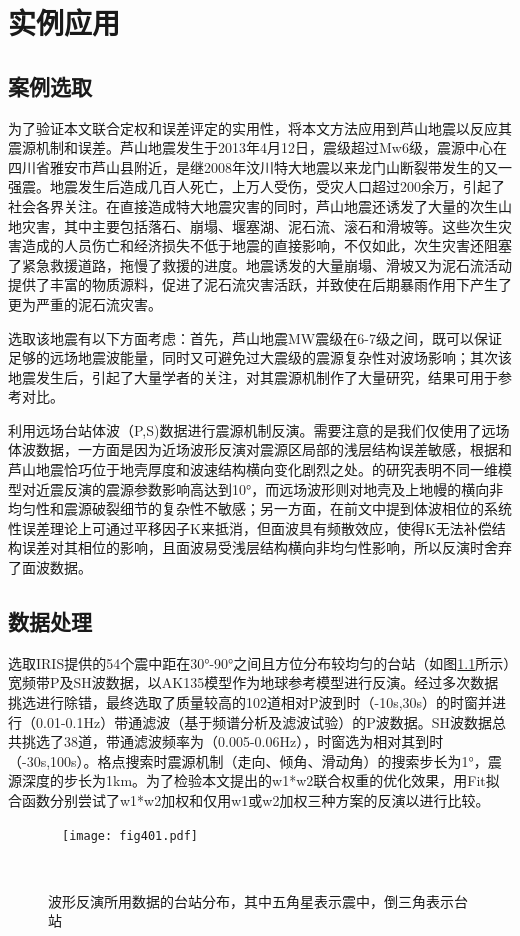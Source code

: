 

\chapter{实例应用}

\section{案例选取}

为了验证本文联合定权和误差评定的实用性，将本文方法应用到芦山地震以反应其震源机制和误差。芦山地震发生于2013年4月12日，震级超过Mw6级，震源中心在四川省雅安市芦山县附近，是继2008年汶川特大地震以来龙门山断裂带发生的又一强震。地震发生后造成几百人死亡，上万人受伤，受灾人口超过200余万，引起了社会各界关注。在直接造成特大地震灾害的同时，芦山地震还诱发了大量的次生山地灾害，其中主要包括落石、崩塌、堰塞湖、泥石流、滚石和滑坡等。这些次生灾害造成的人员伤亡和经济损失不低于地震的直接影响，不仅如此，次生灾害还阻塞了紧急救援道路，拖慢了救援的进度。地震诱发的大量崩塌、滑坡又为泥石流活动提供了丰富的物质源料，促进了泥石流灾害活跃，并致使在后期暴雨作用下产生了更为严重的泥石流灾害。

选取该地震有以下方面考虑：首先，芦山地震MW震级在6-7级之间，既可以保证足够的远场地震波能量，同时又可避免过大震级的震源复杂性对波场影响；其次该地震发生后，引起了大量学者的关注，对其震源机制作了大量研究，结果可用于参考对比。

利用远场台站体波（P,S)数据进行震源机制反演。需要注意的是我们仅使用了远场体波数据，一方面是因为近场波形反演对震源区局部的浅层结构误差敏感，根据和 芦山地震恰巧位于地壳厚度和波速结构横向变化剧烈之处。的研究表明不同一维模型对近震反演的震源参数影响高达到10°，而远场波形则对地壳及上地幔的横向非均匀性和震源破裂细节的复杂性不敏感；另一方面，在前文中提到体波相位的系统性误差理论上可通过平移因子K来抵消，但面波具有频散效应，使得K无法补偿结构误差对其相位的影响，且面波易受浅层结构横向非均匀性影响，所以反演时舍弃了面波数据。

\section{数据处理}

选取IRIS提供的54个震中距在30°-90°之间且方位分布较均匀的台站（如图\ref{fig401}所示）宽频带P及SH波数据，以AK135模型\citep{Kennett1995}作为地球参考模型进行反演。经过多次数据挑选进行除错，最终选取了质量较高的102道相对P波到时（-10s,30s）的时窗并进行（0.01-0.1Hz）带通滤波（基于频谱分析及滤波试验）的P波数据。SH波数据总共挑选了38道，带通滤波频率为（0.005-0.06Hz），时窗选为相对其到时（-30s,100s）。格点搜索时震源机制（走向、倾角、滑动角）的搜索步长为1°，震源深度的步长为1km。为了检验本文提出的w1*w2联合权重的优化效果，用Fit拟合函数分别尝试了w1*w2加权和仅用w1或w2加权三种方案的反演以进行比较。
\begin{figure}
\centering
  \texttt{[image: fig401.pdf]}
  \caption{波形反演所用数据的台站分布，其中五角星表示震中，倒三角表示台站}
  \label{fig401}
\end{figure}

